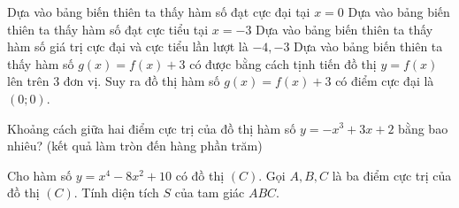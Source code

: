 \begin{ex}
\begin{ex}
{\begin{center}
 \end{center}
 \begin{itemchoice}
 \itemch Dựa vào bảng biến thiên ta thấy hàm số đạt cực đại tại $x=0$
 \itemch Dựa vào bảng biến thiên ta thấy hàm số đạt cực tiểu tại $x=-3$
 \itemch Dựa vào bảng biến thiên ta thấy hàm số giá trị cực đại và cực tiểu lần lượt là $-4,-3$
 \itemch Dựa vào bảng biến thiên ta thấy hàm số $g(x)=f(x)+3$ có được bằng cách tịnh tiến đồ thị $y=f(x)$ lên trên 3 đơn vị. Suy ra đồ thị hàm số $g(x)=f(x)+3$ có điểm cực đại là $(0;0)$.
 \end{itemchoice}
 }
\end{ex}
\BTTL
\begin{ex}
 Khoảng cách giữa hai điểm cực trị của đồ thị hàm số $y=-x^3+3x+2$ bằng bao nhiêu? (kết quả làm tròn đến hàng phần trăm)
\end{ex}
\begin{ex}
 Cho hàm số $ y=x^4-8x^2+10 $ có đồ thị $ (C) $. Gọi $ A,B,C $ là ba điểm cực trị của đồ thị $ (C) $. Tính diện tích $ S $ của tam giác $ ABC. $
\end{ex}
\end{ex}
